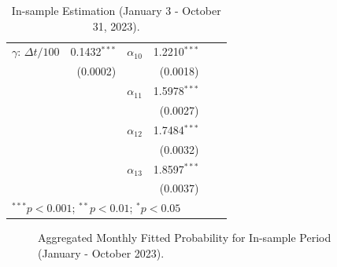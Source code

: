 \begin{table}[H]
\begin{center}
{\begin{threeparttable}
\begin{tabular}{lrlrlr}
$\gamma$: \(\Delta t/100\) & 0.1432$^{***}$ & $\alpha_{10}$ & 1.2210$^{***}$ & & \\
 & (0.0002) & & (0.0018) & & \\
 
 & & $\alpha_{11}$ & 1.5978$^{***}$ & & \\
 & & & (0.0027) & & \\
 
 & & $\alpha_{12}$ & 1.7484$^{***}$ & & \\
 & & & (0.0032) & & \\
 
 & & $\alpha_{13}$ & 1.8597$^{***}$ & & \\
 & & & (0.0037) & & \\
\bottomrule
\multicolumn{6}{l}{\scriptsize{$^{***}p<0.001$; $^{**}p<0.01$; $^{*}p<0.05$}}
\end{tabular}
\end{threeparttable}}
\caption{In-sample Estimation (January 3 - October 31, 2023).}
\label{tab:table-10}
\end{center}
\end{table}


\begin{figure}[H]
    \centering
    \caption{Aggregated Monthly Fitted Probability for In-sample Period (January - October 2023).}
    \label{fig:figure-3}
\end{figure}

